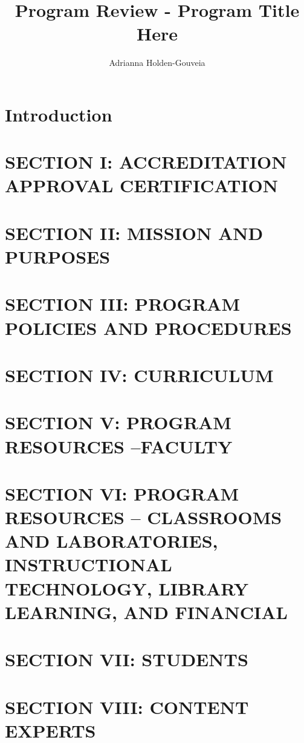 \documentclass[12pt,a4paper,man,natbib,donotrepeattitle]{apa6}
\title{Program Review - Program Title Here}
\author{Adrianna Holden-Gouveia}
\affiliation{Northern Essex Community College}
\begin{document}
\maketitle
\doublespacing





\section{Introduction}


\section{SECTION I: ACCREDITATION APPROVAL CERTIFICATION}


\section{SECTION II: MISSION AND PURPOSES}


\section{SECTION III: PROGRAM POLICIES AND PROCEDURES}


\section{SECTION IV: CURRICULUM}


\section{SECTION V: PROGRAM RESOURCES –FACULTY}


\section{SECTION VI: PROGRAM RESOURCES – CLASSROOMS AND LABORATORIES, INSTRUCTIONAL TECHNOLOGY, LIBRARY LEARNING, AND FINANCIAL}


\section{SECTION VII: STUDENTS}


\section{SECTION VIII: CONTENT EXPERTS}

\end{document}
